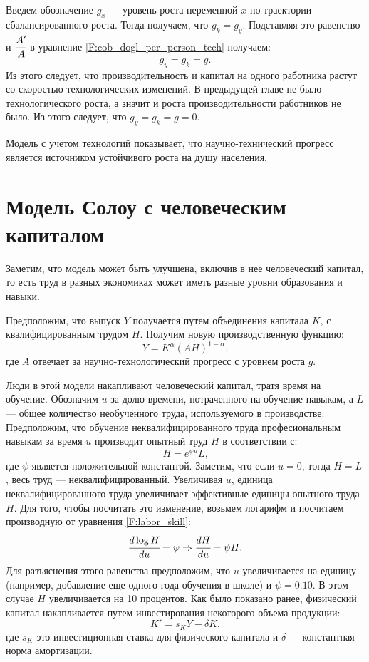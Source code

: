 Введем обозначение $g_{x}$ --- уровень роста переменной $x$ по траектории сбалансированного роста.
Тогда получаем, что $g_{k} = g_{y}$. Подставляя это равенство и $\cfrac{A'}{A}$ в уравнение \ref{F:cob_dogl_per_person_tech} получаем:
\begin{equation*}
g_{y} = g_{k}=g\text{.}
\end{equation*}
Из этого следует, что производительность и капитал на одного работника растут со скоростью технологических изменений.
В предыдущей главе не было технологического роста, а значит и роста производительности работников не было.
Из этого следует, что $g_{y}=g_{k}=g=0$.

Модель с учетом технологий показывает, что научно-технический прогресс является источником устойчивого роста на душу населения.

\section{Модель Солоу с человеческим капиталом}

Заметим, что модель может быть улучшена, включив в нее человеческий капитал, то есть труд в разных экономиках может иметь разные уровни образования и навыки.

Предположим, что выпуск $Y$ получается путем объединения капитала $K$, с квалифицированным трудом $H$.
Получим новую производственную функцию:
\begin{equation}
Y=K^{\alpha}(AH)^{1-\alpha}\text{,}
\end{equation}
где $A$ отвечает за научно-технологический прогресс с уровнем роста $g$.

Люди в этой модели накапливают человеческий капитал, тратя время на обучение.
Обозначим $u$ за долю времени, потраченного на обучение навыкам, а $L$ --- общее количество необученного труда, используемого в производстве.
Предположим, что обучение неквалифицированного труда професиональным навыкам за время $u$ производит опытный труд $H$ в соответствии с:
\begin{equation}
H=e^{\psi u} L \text{,}
\label{F:labor_skill}
\end{equation}
где $\psi$ является положительной константой.
Заметим, что если $u = 0$, тогда $H = L$, весь труд --- неквалифицированный.
Увеличивая $u$, единица неквалифицированного труда увеличивает эффективные единицы опытного труда $H$.
Для того, чтобы посчитать это изменение, возьмем логарифм и посчитаем производную от уравнения \ref{F:labor_skill}:
\begin{equation*}
\cfrac{d \log{H}}{du} = \psi \Rightarrow \cfrac{dH}{du}=\psi H\text{.}
\end{equation*}
Для разъяснения этого равенства предположим, что $u$ увеличивается на единицу (например, добавление еще одного года обучения в школе) и $\psi = 0.10$.
В этом случае $H$ увеличивается на 10 процентов.
Как было показано ранее, физический капитал накапливается путем инвестирования некоторого объема продукции:
\begin{equation*}
K'=s_{K}Y - \delta K \text{,}
\end{equation*}
где $s_{K}$ это инвестиционная ставка для физического капитала и $\delta$ --- константная норма амортизации.

